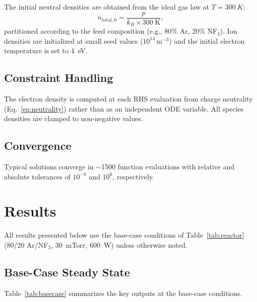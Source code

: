 \documentclass[11pt,a4paper]{article}
\begin{document}
The initial neutral densities are obtained from the ideal gas law at
$T = \SI{300}{K}$:
\begin{equation}
  n_{\text{total},0} = \frac{p}{k_B \times 300\;\text{K}},
\end{equation}
partitioned according to the feed composition (e.g., 80\% Ar, 20\% NF$_3$).
Ion densities are initialized at small seed values ($10^{14}$\,m$^{-3}$) and the
initial electron temperature is set to 4~eV.

\subsection{Constraint Handling}

The electron density is computed at each RHS evaluation from charge neutrality
(Eq.~\ref{eq:neutrality}) rather than as an independent ODE variable. All
species densities are clamped to non-negative values.

\subsection{Convergence}

Typical solutions converge in $\sim$1500 function evaluations with relative and
absolute tolerances of $10^{-8}$ and $10^{6}$, respectively.


\section{Results}
\label{sec:results}

All results presented below use the base-case conditions of
Table~\ref{tab:reactor} (80/20 Ar/NF$_3$, 30~mTorr, 600~W) unless otherwise
noted.

\subsection{Base-Case Steady State}

Table~\ref{tab:basecase} summarizes the key outputs at the base-case conditions.
\end{document}
